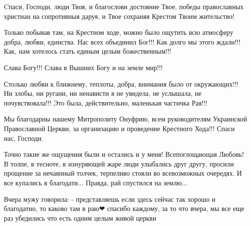 \begin{itemize}
Cпаси, Господи, люди Твоя, и благослови достояние Твое, победы православных
христиан на сопротивныя даруя, и Твое сохраняя Крестом Твоим жительство!


 

Только побывав там, на Крестном ходе, можно было ощутить всю атмосферу добра,
любви, единства. Нас всех объединил Бог!!! Как долго мы этого ждали!!! Как, нам
хотелось стать единым целым божественным!!!

Слава Богу!!! Слава в Вышних Богу и на земле мир!!!

Столько любви к ближнему, теплоты, добра, внимания было от окружающих!!! Ни
злобы, ни ругани, ни ненависти я не увидела, не услышала, не почувствовала!!!
Это была, действительно, маленькая частичка Рая!!!

Мы благодарны нашему Митрополиту Онуфрию, всем руководителям Украинской
Православной Церкви, за организацию и проведение Крестного Хода!!! Спаси нас,
Господи.

 

Точно такие же ощущения были и остались и у меня! Всепоглощающая Любовь! В
толпе, в тесноте, в изнуряющей жаре люди улыбались друг другу, просили прощение
за нечаянный толчек, терпеливо стояли во всевозможных очередях. И все купались
в благодати... Правда, рай спустился на землю...

 

Вчера мужу говорила: - представляешь если здесь сейчас так хорошо и благодатно,
то каково там в раю❤ спасибо каждому, за то что вчера, мы все еще раз убедились
что есть одним целым живой церкви🙏


 

\end{itemize}
